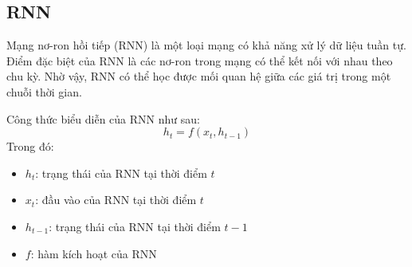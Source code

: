 \subsection{RNN}
Mạng nơ-ron hồi tiếp (RNN) là một loại mạng có khả năng xử lý dữ liệu tuần tự. Điểm đặc biệt của RNN là các nơ-ron trong mạng có thể kết nối với nhau theo chu kỳ. Nhờ vậy, RNN có thể học được mối quan hệ giữa các giá trị trong một chuỗi thời gian.

Công thức biểu diễn của RNN như sau:
\begin{equation}
h_t = f(x_t, h_{t-1})
\end{equation}
Trong đó:
\begin{itemize}
    \item $h_t$: trạng thái của RNN tại thời điểm $t$
    \item $x_t$: đầu vào của RNN tại thời điểm $t$
    \item $h_{t-1}$: trạng thái của RNN tại thời điểm $t - 1$
    \item $f$: hàm kích hoạt của RNN
\end{itemize}